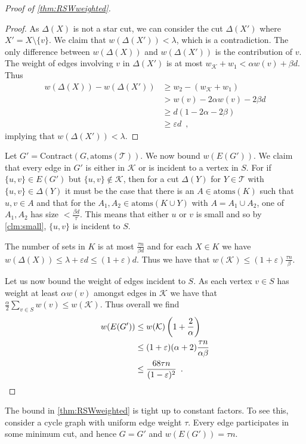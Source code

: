 \documentclass[10pt,a4paper]{article}
\newcommand{\Kcal}{\mathcal{K}}
\newcommand{\Tcal}{\mathcal{T}}
\newcommand{\atoms}{\mathrm{atoms}}
\newcommand{\Contract}{\mathrm{Contract}}
\newcommand{\1}{\mathbf{1}}
\theoremstyle{definition}
\begin{document}
\begin{proof}[Proof of \cref{thm:RSWweighted}]
\begin{proof}
As $\Delta(X)$ is not a star cut, we can consider the cut $\Delta(X')$ where $X' = X \setminus \{v\}$.  We claim that $w(\Delta(X')) < \lambda$, which is 
a contradiction.  The only difference between $w(\Delta(X))$ and $w(\Delta(X'))$ is the contribution of $v$.  The weight of edges involving $v$ in $\Delta(X')$ 
is at most $w_\Kcal + w_1 < \alpha w(v) + \beta d$.  Thus 
\begin{align*}
w(\Delta(X)) - w(\Delta(X')) &\ge w_2 - (w_\Kcal + w_1) \\
&> w(v) - 2\alpha w(v) - 2 \beta d \\
&\ge d(1-2\alpha - 2\beta) \\
&\ge \varepsilon d \enspace ,
\end{align*}
implying that $w(\Delta(X')) < \lambda$.
\end{proof}
Let $G' = \Contract(G, \atoms(\Tcal))$.  We now bound $w(E(G'))$.  We claim that every edge in $G'$ is either in $\Kcal$ or is incident to a vertex in $S$.  For if $\{u,v\} \in E(G')$ but $\{u,v\} \not \in \Kcal$, then for 
a cut $\Delta(Y)$ for $Y \in \Tcal$ with $\{u,v\} \in \Delta(Y)$ it must be the case that there is an $A \in \atoms(K)$ such that $u,v \in A$ and that for the $A_1, A_2 \in \atoms(K \cup Y)$ 
with $A = A_1 \cup A_2$, one of $A_1, A_2$ has size $< \frac{\beta d}{\tau}$.  This means that either $u$ or $v$ is small and so by \cref{clm:small}, $\{u,v\}$ is incident to $S$.  

The number of sets in $K$ is at most $\frac{\tau n}{\beta d}$ and for each $X \in K$ we have $w(\Delta(X)) \le \lambda + \varepsilon d \le (1+ \varepsilon) d$.  Thus 
we have that $w(\Kcal) \le (1+\varepsilon) \frac{\tau n}{\beta}$.  

Let us now bound the weight of edges incident to $S$.  As each vertex $v \in S$ has weight at least $\alpha w(v)$ amongst edges in $\Kcal$ we have that 
$\frac{\alpha}{2} \sum_{v \in S} w(v) \le w(\Kcal)$.  Thus overall we find 
\begin{align*}
w(E(G')) &\le w(\Kcal)\left( 1+ \frac{2}{\alpha}\right) \\
&\le (1+\varepsilon)(\alpha+2) \frac{\tau n}{\alpha \beta} \\
&\le \frac{68 \tau n}{(1-\varepsilon)^2} \enspace . \qedhere
\end{align*}
\end{proof}

The bound in \cref{thm:RSWweighted} is tight up to constant factors.
To see this, consider a cycle graph with uniform edge weight $\tau$.
Every edge participates in some minimum cut, and hence $G=G'$ and $w(E(G')) = \tau n$.
\end{document}
